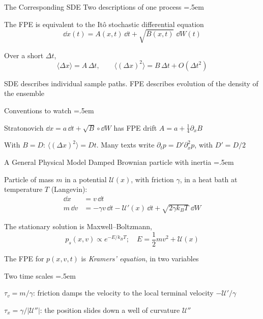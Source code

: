 \documentclass[xcolor={dvipsnames},t]{beamer}
\let\olditemize=\itemize
\let\endolditemize=\enditemize
\renewenvironment{itemize}{\olditemize \itemsep=.5em }{\endolditemize}
\newcommand{\cU}{\mathcal{U}}
\begin{document}
\begin{frame}{The Corresponding SDE}
    \alert{Two descriptions of one process}
    \begin{itemize}
        \item<2-> The FPE is equivalent to the It\^o stochastic differential equation
        \[ \dd x(t) = A(x,t)\,\dd t + \sqrt{B(x,t)}\;\dd W(t) \]
        \item<3-> Over a short $\Delta t$,
        \[ \langle\Delta x\rangle = A\,\Delta t,\qquad \langle(\Delta x)^2\rangle = B\,\Delta t + O(\Delta t^2) \]
        \item<4-> SDE describes individual sample paths. FPE describes evolution of the density of the ensemble
        \item<5-> Conventions to watch
        \begin{itemize}
            \item<6-> Stratonovich $\dd x=a\,\dd t+\sqrt B\circ\dd W$ has FPE drift $A=a+\tfrac14\partial_xB$
            \item<7-> With $B=D$: $\langle(\Delta x)^2\rangle=Dt$. Many texts write $\partial_tp=D'\partial_x^2p$, with $D'=D/2$
        \end{itemize}
    \end{itemize}
\end{frame}

\begin{frame}{A General Physical Model}
    \alert{Damped Brownian particle with inertia}
    \begin{itemize}
        \item<2-> Particle of mass $m$ in a potential $\cU(x)$, with friction $\gamma$, in a heat bath at temperature $T$ (Langevin):
        \begin{align*}
            \dd x &= v\,\dd t \\
            m\,\dd v &= -\gamma v\,\dd t - \cU'(x)\,\dd t + \sqrt{2\gamma k_BT}\;\dd W
        \end{align*}
        \item<3-> The stationary solution is Maxwell--Boltzmann,
        \[ p_s(x,v)\propto e^{-E/k_BT}; \quad E = \frac{1}{2}mv^2+\cU(x) \]
        \item<4-> The FPE for $p(x,v,t)$ is \textit{Kramers' equation}, in two variables
        \item<5-> Two time scales
        \begin{itemize}
            \item<6-> $\tau_v=m/\gamma$: friction damps the velocity to the local terminal velocity $-\cU'/\gamma$
            \item<7-> $\tau_x=\gamma/|\cU''|$: the position slides down a well of curvature $\cU''$
        \end{itemize}
    \end{itemize}
\end{frame}
\end{document}
